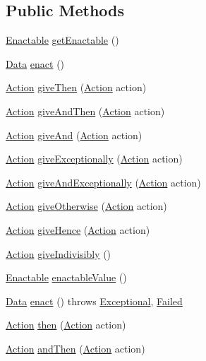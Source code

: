 \subsection*{Public Methods}
\begin{CompactItemize}
\item 
\hyperlink{interfaceEnactable}{Enactable} \hyperlink{classActionImpl_a0}{get\-Enactable} ()
\item 
\hyperlink{interfaceData}{Data} \hyperlink{classActionImpl_a1}{enact} ()
\item 
\hyperlink{interfaceAction}{Action} \hyperlink{classActionImpl_a2}{give\-Then} (\hyperlink{interfaceAction}{Action} action)
\item 
\hyperlink{interfaceAction}{Action} \hyperlink{classActionImpl_a3}{give\-And\-Then} (\hyperlink{interfaceAction}{Action} action)
\item 
\hyperlink{interfaceAction}{Action} \hyperlink{classActionImpl_a4}{give\-And} (\hyperlink{interfaceAction}{Action} action)
\item 
\hyperlink{interfaceAction}{Action} \hyperlink{classActionImpl_a5}{give\-Exceptionally} (\hyperlink{interfaceAction}{Action} action)
\item 
\hyperlink{interfaceAction}{Action} \hyperlink{classActionImpl_a6}{give\-And\-Exceptionally} (\hyperlink{interfaceAction}{Action} action)
\item 
\hyperlink{interfaceAction}{Action} \hyperlink{classActionImpl_a7}{give\-Otherwise} (\hyperlink{interfaceAction}{Action} action)
\item 
\hyperlink{interfaceAction}{Action} \hyperlink{classActionImpl_a8}{give\-Hence} (\hyperlink{interfaceAction}{Action} action)
\item 
\hyperlink{interfaceAction}{Action} \hyperlink{classActionImpl_a9}{give\-Indivisibly} ()
\item 
\hyperlink{interfaceEnactable}{Enactable} \hyperlink{classActionImpl_a10}{enactable\-Value} ()
\item 
\hyperlink{interfaceData}{Data} \hyperlink{classActionImpl_a11}{enact} () throws \hyperlink{classExceptional}{Exceptional}, \hyperlink{classFailed}{Failed}
\item 
\hyperlink{interfaceAction}{Action} \hyperlink{classActionImpl_a12}{then} (\hyperlink{interfaceAction}{Action} action)
\item 
\hyperlink{interfaceAction}{Action} \hyperlink{classActionImpl_a13}{and\-Then} (\hyperlink{interfaceAction}{Action} action)
\item 

\end{CompactItemize}

